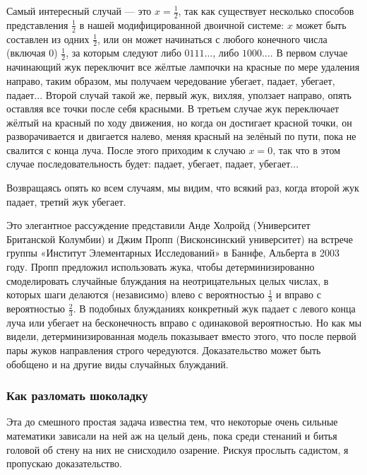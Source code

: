 Самый интересный случай --- это $x=\tfrac12$, так как существует несколько способов представления $\tfrac12$ в нашей модифицированной двоичной системе: $x$ может быть составлен из одних $\tfrac12$, или он может начинаться с любого конечного числа (включая 0) $\tfrac12$, за которым следуют либо $0111\dots$, либо $1000\dots$.
В первом случае начинающий жук переключит все жёлтые лампочки на красные по мере удаления направо, таким образом, мы получаем чередование  убегает, падает, убегает, падает...
Второй случай такой же, первый жук, вихляя, уползает направо, опять оставляя все точки после себя красными.
В третьем случае жук переключает жёлтый на красный по ходу движения, но когда он достигает красной точки, он разворачивается и двигается налево, меняя красный на зелёный по пути, пока не свалится с конца луча.
После этого приходим к случаю $x = 0$, так что в этом случае  последовательность будет: падает, убегает, падает, убегает...

Возвращаясь опять ко всем случаям, мы видим, что всякий раз, когда второй жук падает, третий жук убегает.
\heart

Это элегантное рассуждение представили
Анде Холройд (Университет Британской Колумбии) и Джим Пропп (Висконсинский университет) на встрече группы «Институт Элементарных Исследований» в Баннфе, Альберта в 2003 году.%
Пропп предложил использовать жука, чтобы детерминизированно смоделировать случайные блуждания на неотрицательных целых числах, в которых шаги делаются (независимо) влево с вероятностью $\tfrac13$ и вправо с вероятностью $\tfrac23$.
В подобных блужданиях конкретный жук падает с левого конца луча или убегает на бесконечность вправо с одинаковой вероятностью.
Но как мы видели, детерминизированная модель показывает вместо этого, что после первой пары жуков направления строго чередуются.
Доказательство может быть обобщено и на другие виды случайных блужданий.

\subsubsection*{Как разломать шоколадку}%

Эта до смешного простая задача известна тем, что некоторые очень сильные математики зависали на ней аж на целый день, пока среди стенаний и битья головой об стену на них не снисходило озарение.
Рискуя прослыть садистом, я пропускаю доказательство.
